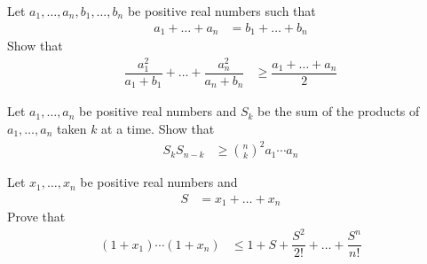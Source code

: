 \documentclass{subfile}
\begin{document}
		\begin{problem}
			Let $a_{1},\ldots,a_{n},b_{1},\ldots,b_{n}$ be positive real numbers such that
				\begin{align*}
					a_{1}+\ldots+a_{n}
						& = b_{1}+\ldots+b_{n}
				\end{align*}
			Show that
				\begin{align*}
					\dfrac{a_{1}^{2}}{a_{1}+b_{1}}+\ldots+\dfrac{a_{n}^{2}}{a_{n}+b_{n}}
						& \geq\dfrac{a_{1}+\ldots+a_{n}}{2}
				\end{align*}
		\end{problem}
	
		\begin{problem}
			Let $a_{1},\ldots,a_{n}$ be positive real numbers and $S_{k}$ be the sum of the products of $a_{1},\ldots,a_{n}$ taken $k$ at a time. Show that
				\begin{align*}
					S_{k}S_{n-k}
						& \geq\binom{n}{k}^{2}a_{1}\cdots a_{n}
				\end{align*}
		\end{problem}
	
		\begin{problem}
			Let $x_{1},\ldots,x_{n}$ be positive real numbers and
				\begin{align*}
					S
						& = x_{1}+\ldots+x_{n}
				\end{align*}
			Prove that
				\begin{align*}
					(1+x_{1})\cdots(1+x_{n})
						& \leq 1+S+\dfrac{S^2}{2!}+\ldots+\dfrac{S^n}{n!}
				\end{align*}
		\end{problem}
\end{document}
